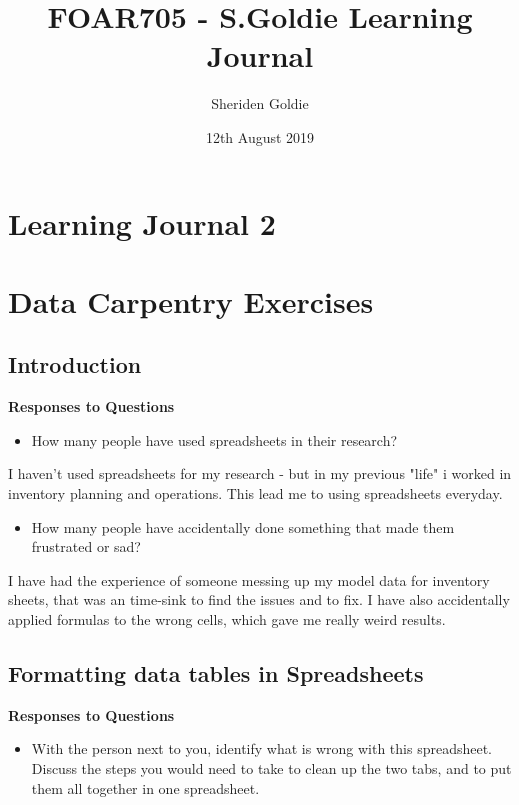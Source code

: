 \documentclass{article}
\title{FOAR705 - S.Goldie Learning Journal}
\author{Sheriden Goldie}
\date{12th August 2019}
\begin{document}
\maketitle
\section*{Learning Journal 2}
\section{Data Carpentry Exercises}
\subsection{Introduction}
\textbf{Responses to Questions}

\begin{itemize}
    \item How many people have used spreadsheets in their research?
\end{itemize}

I haven't used spreadsheets for my research - but in my previous "life" i worked in inventory planning and operations. This lead me to using spreadsheets everyday.

\begin{itemize}
    \item How many people have accidentally done something that made them frustrated or sad?
\end{itemize}

I have had the experience of someone messing up my model data for inventory sheets, that was an time-sink to find the issues and to fix. I have also accidentally applied formulas to the wrong cells, which gave me really weird results. 

\subsection{Formatting data tables in Spreadsheets}
\textbf{Responses to Questions}

\begin{itemize}
    \item With the person next to you, identify what is wrong with this spreadsheet. Discuss the steps you would need to take to clean up the two tabs, and to put them all together in one spreadsheet.
\end{itemize} 
\end{document}
